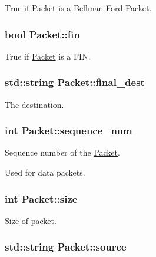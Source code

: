 \-True if \hyperlink{classPacket}{\-Packet} is a \-Bellman-\/\-Ford \hyperlink{classPacket}{\-Packet}. 

\hypertarget{classPacket_a2143fa46561ca6d5f5edd8678602ef6c}{
\subsubsection[{fin}]{\setlength{\rightskip}{0pt plus 5cm}bool {\bf \-Packet\-::fin}}}\label{classPacket_a2143fa46561ca6d5f5edd8678602ef6c}


\-True if \hyperlink{classPacket}{\-Packet} is a \-F\-I\-N. 

\hypertarget{classPacket_a14d18bd9829ec1951730bc8bbadb570d}{
\subsubsection[{final\-\_\-dest}]{\setlength{\rightskip}{0pt plus 5cm}std\-::string {\bf \-Packet\-::final\-\_\-dest}}}\label{classPacket_a14d18bd9829ec1951730bc8bbadb570d}


\-The destination. 

\hypertarget{classPacket_a1dcc152b6caa339c9d6f86c0fcde1c52}{
\subsubsection[{sequence\-\_\-num}]{\setlength{\rightskip}{0pt plus 5cm}int {\bf \-Packet\-::sequence\-\_\-num}}}\label{classPacket_a1dcc152b6caa339c9d6f86c0fcde1c52}


\-Sequence number of the \hyperlink{classPacket}{\-Packet}. 

\-Used for data packets. \hypertarget{classPacket_ad6c10fc808850949cd3f9b9a2ff018d5}{
\subsubsection[{size}]{\setlength{\rightskip}{0pt plus 5cm}int {\bf \-Packet\-::size}}}\label{classPacket_ad6c10fc808850949cd3f9b9a2ff018d5}


\-Size of packet. 

\hypertarget{classPacket_a9fdc30310ed4a548f4a51dc6c79442d9}{
\subsubsection[{source}]{\setlength{\rightskip}{0pt plus 5cm}std\-::string {\bf \-Packet\-::source}}}\label{classPacket_a9fdc30310ed4a548f4a51dc6c79442d9}


